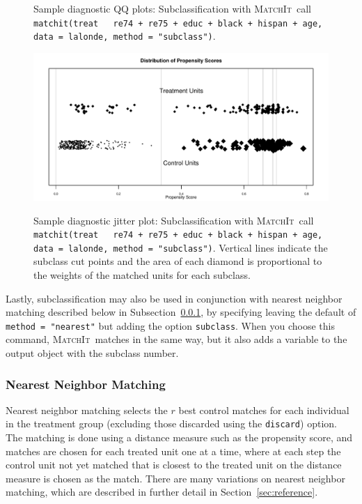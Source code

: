 \documentclass[oneside,letterpaper,titlepage]{article}
\newcommand{\MatchIt}{\textsc{MatchIt}}
\begin{document}
\begin{figure}[tbp]
\begin{center}
    \hfill
    \caption{Sample diagnostic QQ plots: Subclassification with
      \MatchIt\ call \texttt{matchit(treat ~ re74 + re75 + educ +
        black + hispan + age, data = lalonde, method = "subclass")}.}
\label{diagqqsub}
\end{center}
\end{figure}

\begin{figure}[tbp]
  \begin{center}
    {\includegraphics[scale=0.7]{figs/jitterplotsub}}
    \hfill
    \caption{Sample diagnostic jitter plot: Subclassification with
      \MatchIt\ call \texttt{matchit(treat ~ re74 + re75 + educ +
        black + hispan + age, data = lalonde, method = "subclass")}.
      Vertical lines indicate the subclass cut points and the area of
      each diamond is proportional to the weights of the matched units
      for each subclass.}
\label{diagjittersub}
\end{center}
\end{figure}


Lastly, subclassification may also be used in conjunction with nearest
neighbor matching described below in Subsection~\ref{subsubsec:nearest}, by
specifying leaving the default of \texttt{method = "nearest"} but
adding the option \texttt{subclass}.  When you choose this command,
\MatchIt\ matches in the same way, but it also adds a variable to the
output object with the subclass number.

\subsubsection{Nearest Neighbor Matching}
\label{subsubsec:nearest}

Nearest neighbor matching selects the $r$ best control matches for
each individual in the treatment group (excluding those discarded
using the \texttt{discard}) option.  The matching is done using a
distance measure such as the propensity score, and matches are chosen
for each treated unit one at a time, where at each step the control
unit not yet matched that is closest to the treated unit on the
distance measure is chosen as the match.  There are many variations on
nearest neighbor matching, which are described in further detail in
Section~\ref{sec:reference}. 
\end{document}

